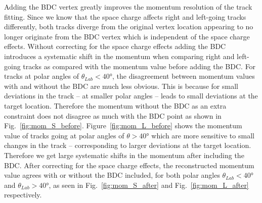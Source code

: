 Adding the BDC vertex greatly improves the momentum resolution of the track fitting.  Since we know that the space charge affects right and left-going tracks differently, both tracks diverge from the original vertex location appearing to no longer originate from the BDC vertex which is independent of the space charge effects. Without correcting for the space charge effects adding the BDC introduces a systematic shift in the momentum when comparing right and left-going tracks as compared with the momentum value before adding the BDC. For tracks at polar angles of $\theta_{Lab} < \ang{40}$, the disagreement between momentum values with and without the BDC are much less obvious. This is because for small deviations in the track -- at smaller polar angles -- leads to small deviations at the target location. Therefore the momentum without the BDC as an extra constraint does not disagree as much with the BDC point as shown in Fig.~\ref{fig:mom_S_before}. Figure~\ref{fig:mom_L_before} shows the momentum value of tracks going at polar angles of $\theta > \ang{40}$ which are more sensitive to small changes in the track -- corresponding to larger deviations at the target location. Therefore we get large systematic shifts in the momentum after including the BDC. After correcting for the space charge effects, the reconstructed momentum value agrees with or without the BDC included, for both  polar angles $\theta_{Lab} < \ang{40}$ and $\theta_{Lab} > \ang{40}$, as seen in Fig.~\ref{fig:mom_S_after} and Fig.~\ref{fig:mom_L_after} respectively. 


\begin{figure}[!htb]%
    \centering
    \qquad
    \\
    \qquad

 \label{fig:mom_sc}
\end{figure}



